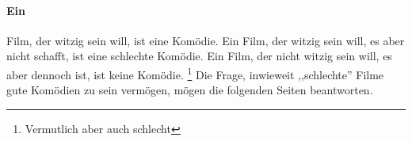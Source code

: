 \paragraph{Ein}
Film, der witzig sein will, ist eine Komödie.
Ein Film, der witzig sein will, es aber nicht schafft, ist eine schlechte Komödie.
Ein Film, der nicht witzig sein will, es aber dennoch ist, ist keine Komödie. \footnote{Vermutlich aber auch schlecht}
Die Frage, inwieweit ,,schlechte'' Filme gute Komödien zu sein vermögen, mögen die folgenden Seiten beantworten.
 



